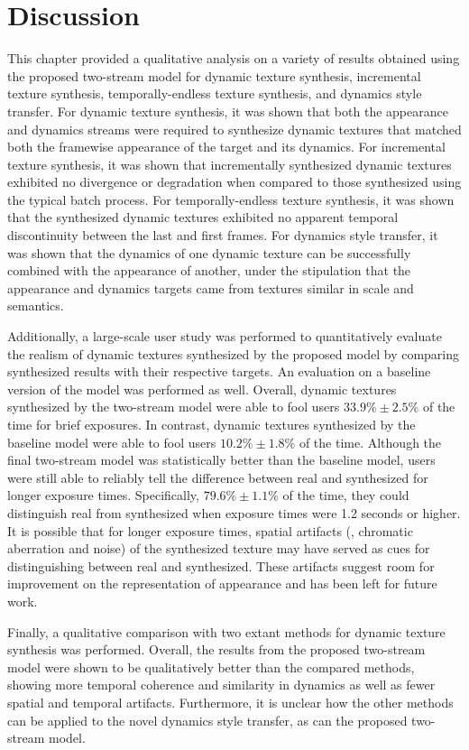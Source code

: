 \section{Discussion}

This chapter provided a qualitative analysis on a variety of results obtained using the proposed two-stream model for dynamic texture synthesis, incremental texture synthesis, temporally-endless texture synthesis, and dynamics style transfer. For dynamic texture synthesis, it was shown that both the appearance and dynamics streams were required to synthesize dynamic textures that matched both the framewise appearance of the target and its dynamics. For incremental texture synthesis, it was shown that incrementally synthesized dynamic textures exhibited no divergence or degradation when compared to those synthesized using the typical batch process. For temporally-endless texture synthesis, it was shown that the synthesized dynamic textures exhibited no apparent temporal discontinuity between the last and first frames. For dynamics style transfer, it was shown that the dynamics of one dynamic texture can be successfully combined with the appearance of another, under the stipulation that the appearance and dynamics targets came from textures similar in scale and semantics.

Additionally, a large-scale user study was performed to quantitatively evaluate the realism of dynamic textures synthesized by the proposed model by comparing synthesized results with their respective targets. An evaluation on a baseline version of the model was performed as well. Overall, dynamic textures synthesized by the two-stream model were able to fool users $33.9\% \pm 2.5\%$ of the time for brief exposures. In contrast, dynamic textures synthesized by the baseline model were able to fool users $10.2\% \pm 1.8\%$ of the time. 
Although the final two-stream model was statistically better than the baseline model, users were still able to reliably tell the difference between real and synthesized for longer exposure times. Specifically, $79.6\% \pm 1.1\%$ of the time, they could distinguish real from synthesized when exposure times were 1.2 seconds or higher. It is possible that for longer exposure times, spatial artifacts (\eg, chromatic aberration and noise) of the synthesized texture may have served as cues for distinguishing between real and synthesized. These artifacts suggest room for improvement on the representation of appearance and has been left for future work.

Finally, a qualitative comparison with two extant methods for dynamic texture synthesis was performed. Overall, the results from the proposed two-stream model were shown to be qualitatively better than the compared methods, showing more temporal coherence and similarity in dynamics as well as fewer spatial and temporal artifacts. Furthermore, it is unclear how the other methods can be applied to the novel dynamics style transfer, as can the proposed two-stream model.